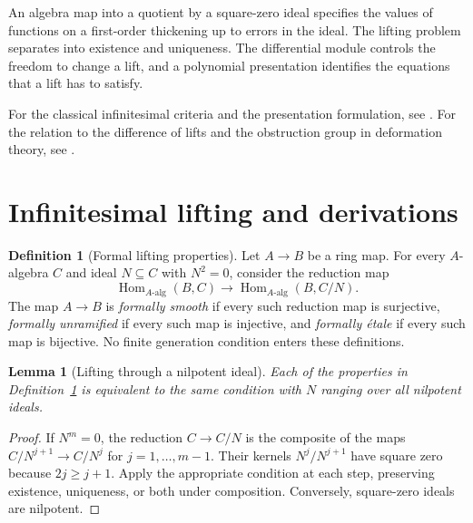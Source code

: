 \documentclass[11pt,oneside,openany]{book}
\newtheorem{lemma}[theorem]{Lemma}
\theoremstyle{definition}
\newtheorem{definition}[theorem]{Definition}
\theoremstyle{remark}
\begin{document}
An algebra map into a quotient by a square-zero ideal specifies the values of
functions on a first-order thickening up to errors in the ideal. The lifting
problem separates into existence and uniqueness. The differential module
controls the freedom to change a lift, and a polynomial presentation identifies
the equations that a lift has to satisfy.

For the classical infinitesimal criteria and the presentation formulation,
see \cite[Sections 10.138, 10.148, and 10.150]{stacks}.
For the relation to the difference of lifts and the obstruction group
in deformation theory, see \cite[Proposition 3.10 and Lemma 4.5]{hartshorne}.

\section{Infinitesimal lifting and derivations}

\begin{definition}[Formal lifting properties]\label{res:FL-01}
Let $A\to B$ be a ring map. For every $A$-algebra $C$ and ideal $N\subseteq C$
with $N^2=0$, consider the reduction map
\[
  \operatorname{Hom}_{A\text{-alg}}(B,C)\longrightarrow
  \operatorname{Hom}_{A\text{-alg}}(B,C/N).
\]
The map $A\to B$ is \emph{formally smooth} if every such reduction map is
surjective, \emph{formally unramified} if every such map is injective, and
\emph{formally \'{e}tale} if every such map is bijective. No finite generation
condition enters these definitions.
\end{definition}

\begin{lemma}[Lifting through a nilpotent ideal]\label{res:FL-02}
Each of the properties in Definition~\ref{res:FL-01} is equivalent to the same
condition with $N$ ranging over all nilpotent ideals.
\end{lemma}
\begin{proof}
If $N^m=0$, the reduction $C\to C/N$ is the composite of the maps
$C/N^{j+1}\to C/N^j$ for $j=1,\ldots,m-1$. Their kernels $N^j/N^{j+1}$
have square zero because $2j\ge j+1$. Apply the appropriate condition at each
step, preserving existence, uniqueness, or both under composition. Conversely,
square-zero ideals are nilpotent.
\end{proof}
\end{document}
